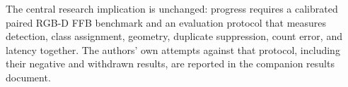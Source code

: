 The central research implication is unchanged: progress requires a calibrated paired RGB-D FFB benchmark and an evaluation protocol that measures detection, class assignment, geometry, duplicate suppression, count error, and latency together. The authors' own attempts against that protocol, including their negative and withdrawn results, are reported in the companion results document.
